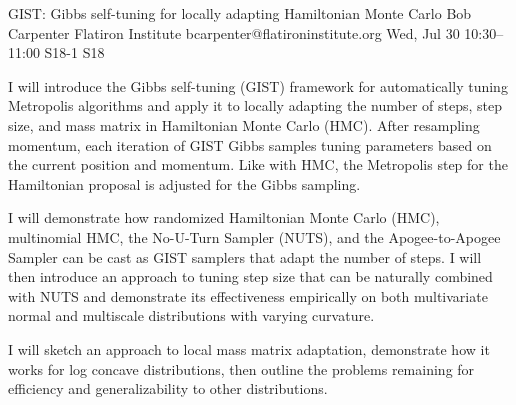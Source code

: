 \begin{talk}
  {GIST: Gibbs self-tuning for locally adapting Hamiltonian Monte Carlo}%
  {Bob Carpenter}%
  {Flatiron Institute}%
  {bcarpenter@flatironinstitute.org}%
  {}%
  {}%
  {Wed, Jul 30 10:30–11:00}%
  {S18-1}%
  {S18}%
  {}%
  
				
			
I will introduce the Gibbs self-tuning (GIST) framework for automatically tuning Metropolis algorithms and apply it to locally adapting the number of steps, step size, and mass matrix in Hamiltonian Monte Carlo (HMC).  After resampling momentum, each iteration of GIST Gibbs samples tuning parameters based on the current position and momentum.  Like with HMC, the Metropolis step for the Hamiltonian proposal is adjusted for the Gibbs sampling.

I will demonstrate how randomized Hamiltonian Monte Carlo (HMC), multinomial HMC, the No-U-Turn Sampler (NUTS), and the Apogee-to-Apogee Sampler can be cast as GIST samplers that adapt the number of steps.  I will then introduce an approach to tuning step size that can be naturally combined with NUTS and demonstrate its effectiveness empirically on both multivariate normal and multiscale distributions with varying curvature.  

I will sketch an approach to local mass matrix adaptation, demonstrate how it works for log concave distributions, then outline the problems remaining for efficiency and generalizability to other distributions.

\end{talk}

